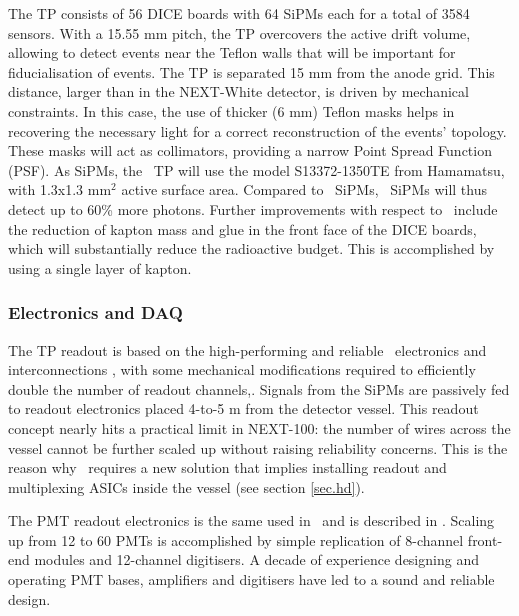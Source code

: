 The TP consists of 56 DICE boards with 64 SiPMs each for a total of 3584 sensors. With a 15.55 mm pitch, the TP overcovers the active drift volume, allowing to detect events near the Teflon walls that will be important for fiducialisation of events.
The TP is separated 15 mm from the anode grid. This distance, larger than in the NEXT-White detector, is driven by mechanical constraints. In this case, the use of thicker (6 mm) Teflon masks helps in recovering the necessary light for a correct reconstruction of the events’ topology. These masks will act as collimators, providing a narrow Point Spread Function (PSF). As SiPMs, the \Next\ TP will use the model S13372-1350TE from Hamamatsu, with 1.3x1.3 mm$^2$ active surface area. Compared to \New\ SiPMs, \Next\ SiPMs will thus detect up to 60\% more photons.
Further improvements with respect to \NEW\ include the reduction of kapton mass and glue in the front face of the DICE boards, which will substantially reduce the radioactive budget. This is accomplished by using a single layer of kapton.

\subsubsection{Electronics and DAQ}

The TP readout is based on the high-performing and reliable \NEW\ electronics and interconnections \cite{Rodriguez:2015a}, with some mechanical modifications required to efficiently double the number of readout channels,. Signals from the SiPMs are passively fed to readout electronics placed 4-to-5 m from the detector vessel. This readout concept nearly hits a practical limit in NEXT-100: the number of wires across the vessel cannot be further scaled up without raising reliability concerns. This is the reason why \NHD\  requires a new solution that implies installing readout and multiplexing ASICs inside the vessel (see section \ref{sec.hd}). %

\indent

The PMT readout electronics is the same  used in \NEW\ and is described in \cite{Alvarez:2019a}. Scaling up from 12 to 60 PMTs is accomplished by simple replication of 8-channel front-end modules and 12-channel digitisers. A decade of experience designing and operating PMT bases, amplifiers and digitisers have led to a sound and reliable design. %

